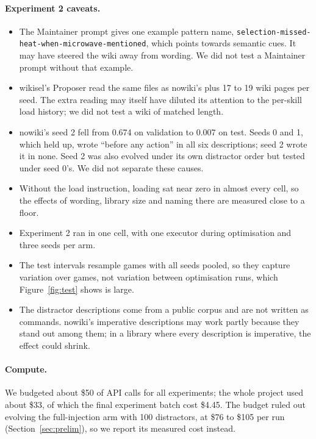 \documentclass[11pt]{article}
\newcommand{\code}[1]{\texttt{#1}}
\begin{document}
\paragraph{Experiment 2 caveats.}
\begin{itemize}
\item The Maintainer prompt gives one example pattern name, \code{selection-missed-heat-\allowbreak when-microwave-\allowbreak mentioned}, which points towards semantic cues. It may have steered the wiki away from wording. We did not test a Maintainer prompt without that example.
\item wikisel's Proposer read the same files as nowiki's plus 17 to 19 wiki pages per seed. The extra reading may itself have diluted its attention to the per-skill load history; we did not test a wiki of matched length.
\item nowiki's seed 2 fell from 0.674 on validation to 0.007 on test. Seeds 0 and 1, which held up, wrote ``before any action'' in all six descriptions; seed 2 wrote it in none. Seed 2 was also evolved under its own distractor order but tested under seed 0's. We did not separate these causes.
\item Without the load instruction, loading sat near zero in almost every cell, so the effects of wording, library size and naming there are measured close to a floor.
\item Experiment 2 ran in one cell, with one executor during optimisation and three seeds per arm.
\item The test intervals resample games with all seeds pooled, so they capture variation over games, not variation between optimisation runs, which Figure~\ref{fig:test} shows is large.
\item The distractor descriptions come from a public corpus and are not written as commands. nowiki's imperative descriptions may work partly because they stand out among them; in a library where every description is imperative, the effect could shrink.
\end{itemize}

\paragraph{Compute.} We budgeted about \$50 of API calls for all experiments; the whole project used about \$33, of which the final experiment batch cost \$4.45. The budget ruled out evolving the full-injection arm with 100 distractors, at \$76 to \$105 per run (Section~\ref{sec:prelim}), so we report its measured cost instead.
\end{document}
